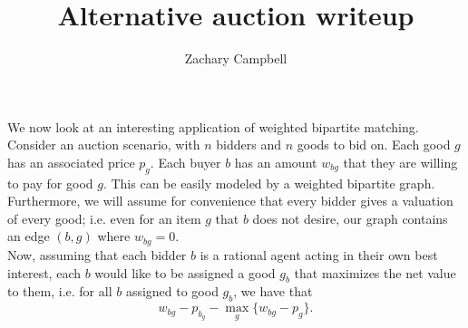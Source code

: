 \documentclass[11pt]{article}
\renewcommand{\'}{^{'}}
\begin{document}
\title{Alternative auction writeup}
\author{Zachary Campbell}

\maketitle
We now look at an interesting application of weighted bipartite matching. Consider an auction scenario, 
with $n$ bidders and $n$ goods to bid on. Each good $g$ has an associated price $p_g$. Each buyer $b$ has 
an amount $w_{bg}$ that they are willing to pay for good $g$. This can be easily modeled by a 
weighted bipartite graph. Furthermore, we will assume for convenience that every bidder gives a 
valuation of every good; i.e. even for an item $g$ that $b$ does not desire, our graph contains an edge 
$(b,g)$ where $w_{bg} = 0$. \\
Now, assuming that each bidder $b$ is a rational agent acting in their own best interest, each $b$ 
would like to be assigned a good $g_b$ that maximizes the net value to them, i.e. for all $b$ assigned 
to good $g_b$, we have that 
\[
	w_{bg} - p_{b_g}  - \max _g \{w_{bg} - p_g \}.
\]
\end{document}
